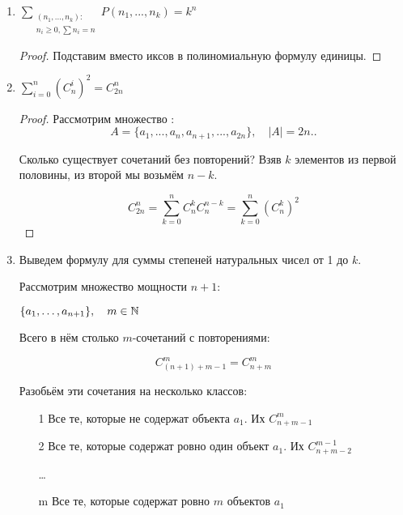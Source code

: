 \begin{enumerate}
\begin{proof}[Доказательство 2]
$ A = \{ (0,\dots, 1,0, \dots, 1 )\} $

Тогда, очевидно, мощность такого множества $2^n$. Посчитаем её другим способом. Найдём количество $n$-ок, в которых ровно $k$ единиц. Очевидно, их будет $C^k_n$. Просуммировав их, получим доказываемое тождество.
\end{proof}

\item $ \sum  _{\substack{
     (n_1, ..., n_k): \\   
      n_i \geq 0, \sum n_i = n }}
    P(n_1, ..., n_k) = k^n$ 
\begin{proof}
Подставим вместо иксов в полиномиальную формулу единицы. 
\end{proof}

\item $\sum \limits _{i=0} ^n {(C^ i _n )^2 } = C^n _{2 n}$
\begin{proof}
Рассмотрим множество :
\[
A = \{a_1, ..., a_n, a_{n+1}, ... ,a_{2n} \} , \quad |A| = 2n .
.\]

Сколько существует сочетаний без повторений?
Взяв $k$ элементов из первой половины, из второй мы возьмём $n-k$.

\[ C^ n _{2 n} = \sum \limits_{k=0}^n C^k _n C^{n-k} _n = \sum \limits _{k=0} ^n (C^k _n) ^2 \]
\end{proof}


\item Выведем формулу для суммы степеней натуральных чисел от 1 до $k$.

Рассмотрим множество мощности $n+1$:

$ \{a_1, \dots, a_{n+1} \}, \quad m \in \mathbb{N} $ 

Всего в нём столько $m$-сочетаний с повторениями: 

\[ C^m _{(n+1)+m-1} = C^m_{n+m} \]

Разобьём эти сочетания на несколько классов:

\begin{enumerate}

\item[1] Все те, которые не содержат объекта $a_1$. Их $C^m_{n+m-1}$

\item[2] Все те, которые содержат ровно один объект $a_1$. Их $C^{m-1}_{n+m-2}$

\dots

\item[m] Все те, которые содержат ровно $m$ объектов $a_1$
\end{enumerate}


\end{enumerate}
